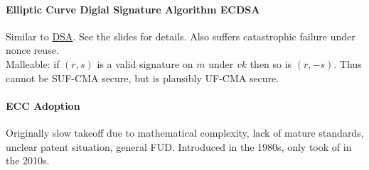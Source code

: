 \paragraph{Elliptic Curve Digial Signature Algorithm ECDSA}
Similar to \hyperlink{dsa}{DSA}.
See the slides for details.
Also suffers catastrophic failure under nonce reuse.
\\
Malleable: if $(r,s)$ is a valid signature on $m$ under $vk$ then so is $(r,-s)$.
Thus cannot be SUF-CMA secure, but is plausibly UF-CMA secure.

\paragraph{ECC Adoption}
Originally slow takeoff due to mathematical complexity, lack of mature standards, unclear patent situation, general FUD.
Introduced in the 1980s, only took of in the 2010s.
